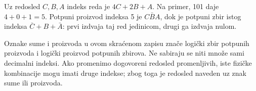 
Uz redosled \(C,B,A\) indeks reda je \(4C+2B+A\). Na primer, 101 daje \(4+0+1=5\). Potpuni proizvod indeksa 5 je \(C\bar BA\), dok je potpuni zbir istog indeksa \(\bar C+B+\bar A\): prvi izdvaja taj red jedinicom, drugi ga izdvaja nulom.

Oznake sume i proizvoda u ovom skraćenom zapisu znače logički zbir potpunih proizvoda i logički proizvod potpunih zbirova. Ne sabiraju se niti množe sami decimalni indeksi. Ako promenimo dogovoreni redosled promenljivih, iste fizičke kombinacije mogu imati druge indekse; zbog toga je redosled naveden uz znak sume ili proizvoda.
